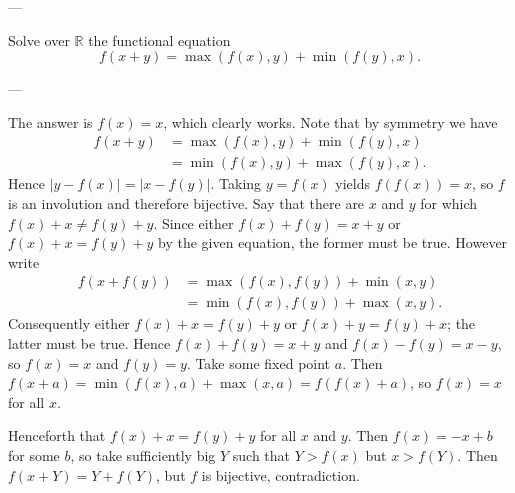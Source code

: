 
---

Solve over $\mathbb R$ the functional equation \[f(x+y)=\max(f(x),y)+\min(f(y),x).\]

---

The answer is $f(x)=x$, which clearly works. Note that by symmetry we have
\begin{align*}
    f(x+y)&=\max(f(x),y)+\min(f(y),x)\\
    &=\min(f(x),y)+\max(f(y),x).
\end{align*}
Hence $|y-f(x)|=|x-f(y)|$. Taking $y=f(x)$ yields $f(f(x))=x$, so $f$ is an involution and therefore bijective. Say that there are $x$ and $y$ for which $f(x)+x\ne f(y)+y$. Since either $f(x)+f(y)=x+y$ or $f(x)+x=f(y)+y$ by the given equation, the former must be true. However write
\begin{align*}
    f(x+f(y))&=\max(f(x),f(y))+\min(x,y)\\
    &=\min(f(x),f(y))+\max(x,y).
\end{align*}
Consequently either $f(x)+x=f(y)+y$ or $f(x)+y=f(y)+x$; the latter must be true. Hence $f(x)+f(y)=x+y$ and $f(x)-f(y)=x-y$, so $f(x)=x$ and $f(y)=y$. Take some fixed point $a$. Then $f(x+a)=\min(f(x),a)+\max(x,a)=f(f(x)+a)$, so $f(x)=x$ for all $x$.

Henceforth that $f(x)+x=f(y)+y$ for all $x$ and $y$. Then $f(x)=-x+b$ for some $b$, so take sufficiently big $Y$ such that $Y>f(x)$ but $x>f(Y)$. Then $f(x+Y)=Y+f(Y)$, but $f$ is bijective, contradiction.
